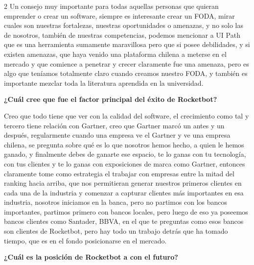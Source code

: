 \documentclass[12pt,spanish,Letterpaper,openany]{book}
\begin{document}
\begin {multicols}{2}
Un consejo muy importante para todas aquellas personas que quieran emprender o crear un software, siempre es interesante crear un FODA, mirar cuales son nuestras fortalezas, nuestras oportunidades o amenazas, y no solo las de nosotros, también de nuestras competencias, podemos mencionar a UI Path que es una herramienta sumamente maravillosa pero que si posee debilidades, y si existen amenazas, que haya venido una plataforma chilena a meterse en el mercado y que comience a penetrar y crecer claramente fue una amenaza, pero es algo que teníamos totalmente claro cuando creamos nuestro FODA, y también es importante mezclar toda la literatura aprendida en la universidad.

\textbf{¿Cuál cree que fue el factor principal del éxito de Rocketbot?}

Creo que todo tiene que ver con la calidad del software, el crecimiento como tal y tercero tiene relación con Gartner, creo que Gartner marcó un antes y un después, regularmente cuando una empresa ve el Gartner y ve una empresa chilena, se pregunta sobre qué es lo que nosotros hemos hecho, a quien le hemos ganado, y finalmente debes de ganarte ese espacio, te lo ganas con tu tecnología, con tus clientes y te lo ganas con exposiciones de marca como Gartner, entonces claramente tome como estrategia el trabajar con empresas entre la mitad del ranking hacia arriba, que nos permitieran generar nuestros primeros clientes en cada una de la industria y comenzar a capturar clientes más importantes en esa industria, nosotros iniciamos en la banca, pero no partimos con los bancos importantes, partimos primero con bancos locales, pero luego de eso ya poseemos bancos clientes como Santader, BBVA, en el que te preguntas como esos bancos son clientes de Rocketbot, pero hay todo un trabajo detrás que ha tomado tiempo, que es en el fondo posicionarse en el mercado.

\textbf{¿Cuál es la posición de Rocketbot a con el futuro?}


\end{multicols}
\end{document}
